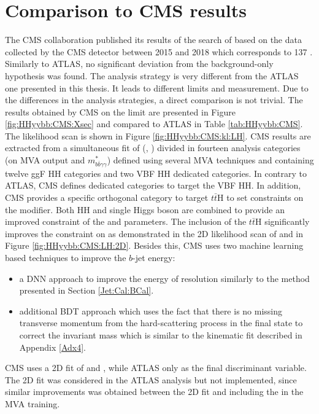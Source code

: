 \section{Comparison to CMS \HHyybb results}
\label{HHyybb:CMS}
The CMS collaboration published its results of the search of \HHyybb based on the data collected by the CMS detector between 2015 and 2018 which corresponds to 137 \ifb \cite{CMS_yybb}. Similarly to ATLAS, no significant deviation from the background-only hypothesis was found. The analysis strategy is very different from the ATLAS one presented in this thesis. It leads to different limits and \kl measurement. Due to the differences in the analysis strategies, a direct comparison is not trivial. The results obtained by CMS on the limit are presented in Figure \ref{fig:HHyybb:CMS:Xsec} and compared to ATLAS in Table \ref{tab:HHyybb:CMS}. The \kl likelihood scan is shown in Figure \ref{fig:HHyybb:CMS:kl:LH}. CMS results are extracted from a simultaneous fit of (\myy, \mbb) divided in fourteen analysis categories (on MVA output and $m_{b \bar{b} \gamma \gamma}^{*}$) defined using several MVA techniques and containing twelve ggF HH categories and two VBF HH dedicated categories. In contrary to ATLAS, CMS defines dedicated categories to target the VBF HH. In addition, CMS provides a specific orthogonal category to target $t\bar{t}$H to set constraints on the \kt modifier. Both HH and single Higgs boson are combined to provide an improved constraint of the \kl and \kt parameters. The inclusion of the $t\bar{t}$H significantly improves the constraint on \kt as demonstrated in the 2D likelihood scan of \kl and \kt in Figure \ref{fig:HHyybb:CMS:LH:2D}. Besides this, CMS uses two machine learning based techniques to improve the $b$-jet energy:
\begin{itemize}
    \item a DNN approach to improve the energy of resolution similarly to the method presented in Section \ref{Jet:Cal:BCal}.
    \item additional BDT approach which uses the fact that there is no missing transverse momentum from the hard-scattering process in the \HHyybb final state to correct the \mbb invariant mass which is similar to the kinematic fit described in Appendix \ref{Adx4}.
\end{itemize}
CMS uses a 2D fit of \myy and \mbb, while ATLAS only \myy as the final discriminant variable. The 2D fit was considered in the ATLAS analysis but not implemented, since similar improvements was obtained between the 2D fit and including the \mbb in the MVA training.

